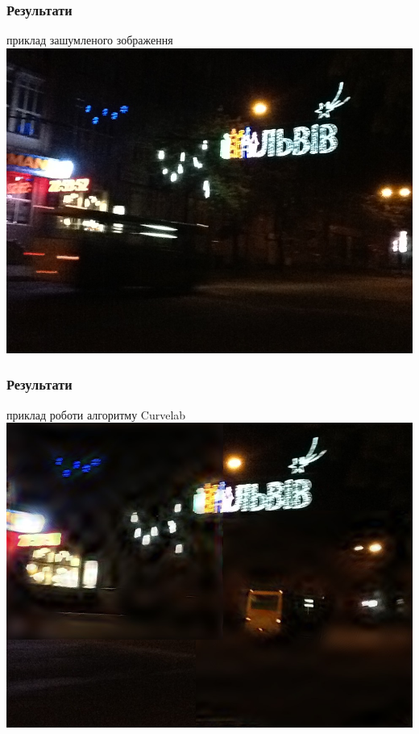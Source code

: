 \documentclass[12pt]{beamer}
\begin{document}
\begin{frame}\frametitle{ Результати}
	приклад зашумленого зображення
	\includegraphics[scale=0.3]{images/lviv_orig}
\end{frame}
\begin{frame}\frametitle{ Результати}
	приклад роботи алгоритму Curvelab
	\includegraphics[scale=0.3]{images/lviv_curvelet}
\end{frame}
\end{document}
